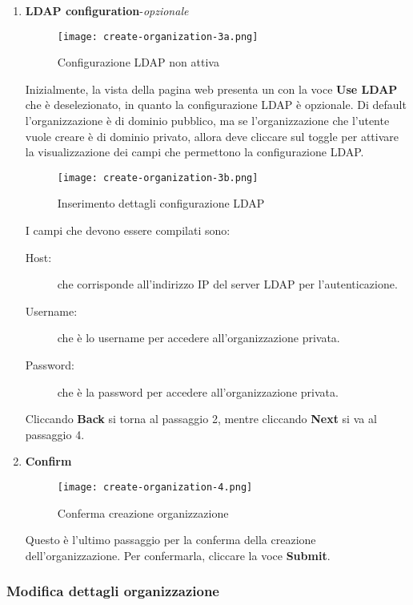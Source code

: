 \documentclass[../manuale-utente.tex]{subfiles}
\begin{document}
\begin{enumerate}
    \item \textbf{LDAP configuration}-\textit{opzionale}

    \begin{figure}[H]
      \centering
      \texttt{[image: create-organization-3a.png]}
      \caption{Configurazione LDAP non attiva}%
      \label{fig:web_app_configurazione_ldap_non_attiva}
    \end{figure}
    Inizialmente, la vista della pagina web presenta un  con la voce \textbf{Use LDAP} che è deselezionato, in quanto la configurazione LDAP è opzionale.
    Di default l'organizzazione è di dominio pubblico, ma se l'organizzazione che l'utente vuole creare è di dominio privato, allora deve cliccare sul toggle per attivare la visualizzazione dei campi che permettono la configurazione LDAP\@.
    \begin{figure}[H]
      \centering
      \texttt{[image: create-organization-3b.png]}
      \caption{Inserimento dettagli configurazione LDAP}%
      \label{fig:web_app_inserimento_dettagli_configurazione_ldap}
    \end{figure}
    I campi che devono essere compilati sono:
    \begin{description}
        \item[Host:] che corrisponde all'indirizzo IP del server LDAP per l'autenticazione.
        \item[Username:] che è lo username per accedere all'organizzazione privata.
        \item[Password:] che è la password per accedere all'organizzazione privata.
    \end{description}
    Cliccando \textbf{Back} si torna al passaggio 2, mentre cliccando \textbf{Next} si va al passaggio 4.

    \item \textbf{Confirm}

    \begin{figure}[H]
        \centering
        \texttt{[image: create-organization-4.png]}
        \caption{Conferma creazione organizzazione}%
        \label{fig:web_app_conferma_organizzazione}
    \end{figure}
    Questo è l'ultimo passaggio per la conferma della creazione dell'organizzazione. Per confermarla, cliccare la voce \textbf{Submit}.
\end{enumerate}

\subsubsection{Modifica dettagli organizzazione}%
\label{subs:modififica_dettagli_organizzazione}
\end{document}
